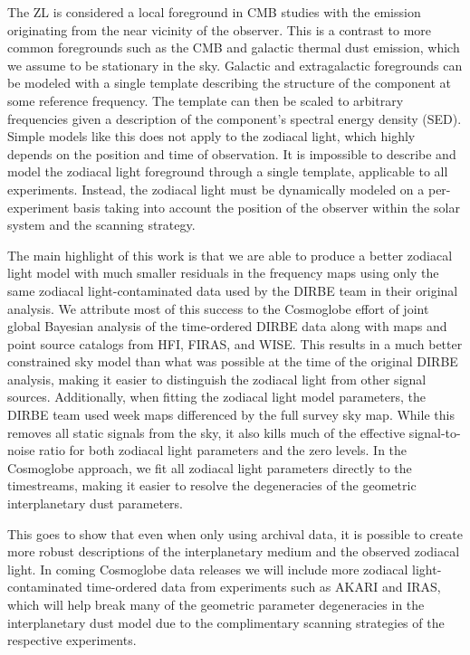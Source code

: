 \documentclass{aa}
\begin{document}
The ZL is considered a local foreground in CMB studies with the emission originating from the near vicinity of the observer. This is a contrast to more common foregrounds such as the CMB and galactic thermal dust emission, which we assume to be stationary in the sky. Galactic and extragalactic foregrounds can be modeled with a single template describing the structure of the component at some reference frequency. The template can then be scaled to arbitrary frequencies given a description of the component's spectral energy density (SED). Simple models like this does not apply to the zodiacal light, which highly depends on the position and time of observation.
It is impossible to describe and model the zodiacal light foreground through a single template, applicable to all experiments. Instead, the zodiacal light must be dynamically modeled on a per-experiment basis taking into account the position of the observer within the solar system and the scanning strategy. 

The main highlight of this work is that we are able to produce a better zodiacal light model with much smaller residuals in the frequency maps using only the same zodiacal light-contaminated data used by the DIRBE team in their original analysis. We attribute most of this success to the Cosmoglobe effort of joint global Bayesian analysis of the time-ordered DIRBE data along with maps and point source catalogs from HFI, FIRAS, and WISE. This results in a much better constrained sky model than what was possible at the time of the original DIRBE analysis, making it easier to distinguish the zodiacal light from other signal sources. Additionally, when fitting the zodiacal light model parameters, the DIRBE team used week maps differenced by the full survey sky map. While this removes all static signals from the sky, it also kills much of the effective signal-to-noise ratio for both zodiacal light parameters and the zero levels. In the Cosmoglobe approach, we fit all zodiacal light parameters directly to the timestreams, making it easier to resolve the degeneracies of the geometric interplanetary dust parameters. 

This goes to show that even when only using archival data, it is possible to create more robust descriptions of the interplanetary medium and the observed zodiacal light. In coming Cosmoglobe data releases we will include more zodiacal light-contaminated time-ordered data from experiments such as AKARI and IRAS, which will help break many of the geometric parameter degeneracies in the interplanetary dust model due to the complimentary scanning strategies of the respective experiments.
\end{document}
